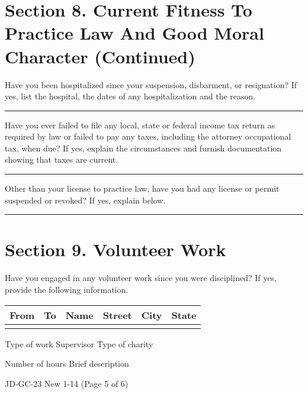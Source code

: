 \documentclass[11pt]{article}
\begin{document}
\section*{Section 8. Current Fitness To Practice Law And Good Moral Character (Continued)}

\noindent

\noindent
Have you been hospitalized since your suspension, disbarment, or resignation? If yes, list the hospital, the dates of any hospitalization and the reason.   \par

\noindent\rule{\textwidth}{0.4pt} %

\vspace{10pt}

\noindent
\noindent
Have you ever failed to file any local, state or federal income tax return as required by law or failed to pay any taxes, including the attorney occupational tax, when due? If yes, explain the circumstances and furnish documentation showing that taxes are current.  \par

\noindent\rule{\textwidth}{0.4pt} %

\vspace{10pt}

\noindent
\noindent
Other than your license to practice law, have you had any license or permit suspended or revoked? If yes, explain below.
  \par
\noindent\rule{\textwidth}{0.4pt} %

\section*{Section 9. Volunteer Work}

\noindent
\noindent
Have you engaged in any volunteer work since you were disciplined? If yes, provide the following information.
  \par
\noindent
\begin{tabular}{|p{0.8in}|p{0.8in}|p{1.8in}|p{1in}|p{0.8in}|p{0.8in}|}
    \hline
    From & To & Name & Street & City & State \\ \hline
    & & & & & \\ \hline %
\end{tabular}

\vspace{10pt}

\noindent
Type of work \hrulefill Supervisor \hrulefill Type of charity \hrulefill

\noindent
Number of hours \hrulefill Brief description \hrulefill

\vfill
\noindent
JD-GC-23 New 1-14 \hfill (Page 5 of 6)
\end{document}
